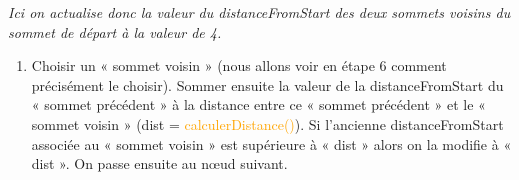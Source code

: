 \documentclass[,french]{article}
\providecommand{\tightlist}{%
  \setlength{\itemsep}{0pt}\setlength{\parskip}{0pt}}
\begin{document}
\begin{center}
\end{center}
\begin{adjustwidth}{50pt}{50pt}
\begin{center}
\emph{Ici on actualise donc la valeur du distanceFromStart des deux sommets voisins du sommet de départ à la valeur de 4.}

\end{center}

\end{adjustwidth}

\begin{enumerate}
\def\labelenumi{\arabic{enumi}.}
\setcounter{enumi}{3}
\tightlist
\item
  Choisir un « sommet voisin » (nous allons voir en étape 6 comment
  précisément le choisir). Sommer ensuite la valeur de la
  distanceFromStart du « sommet précédent » à la distance entre ce «
  sommet précédent » et le « sommet voisin » (dist =
  \textcolor{orange}{calculerDistance()}). Si l'ancienne
  distanceFromStart associée au « sommet voisin » est supérieure à «
  dist » alors on la modifie à « dist ». On passe ensuite au nœud
  suivant.
\end{enumerate}
\end{document}
